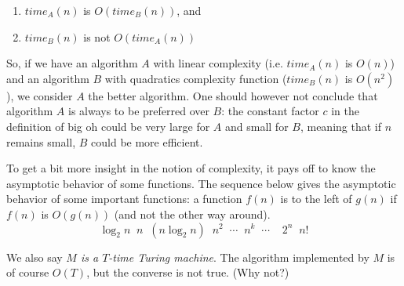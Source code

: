 \begin{enumerate}
\item $time_A(n)$ is $O(time_B(n))$, and
\item $time_B(n)$ is not $O(time_A(n))$
\end{enumerate}

So, if we have an algorithm $A$ with linear complexity
(i.e. $time_A(n)$ is $O(n)$) and an algorithm $B$ with quadratics
complexity function ($time_B(n)$ is $O(n^2)$), we consider $A$ the
better algorithm.  One should however not conclude that algorithm $A$
is always to be preferred over $B$: the constant factor $c$ in the
definition of big oh could be very large for $A$ and small for $B$,
meaning that if $n$ remains small, $B$ could be more efficient.

To get a bit more insight in the notion of complexity, it pays off to
know the asymptotic behavior of some functions. The sequence below
gives the asymptotic behavior of some important functions: a function
$f(n)$ is to the left of $g(n)$ if $f(n)$ is $O(g(n))$ (and not the
other way around).
\[ \log_2 n \;\; n\;\; (n\log_2 n)\;\;  n^2\;\; \cdots\;\; n^k\;\;
\cdots\;\; \;\;2^n \;\; n!  \]





We also say {\em $M$ is a $T$-time Turing machine}. The algorithm
implemented by $M$ is of course $O(T)$, but the converse is not
true. (Why not?)




 





